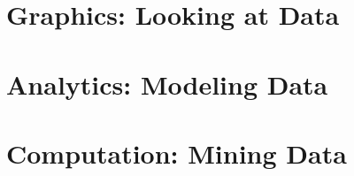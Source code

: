 \documentclass{book}
\begin{document}
\newif\ifplastex
\plastexfalse

\ifplastex
    \usepackage{localdef}
    \maketitle

\else



\fi



\makeatletter
\makeatother




\makeatletter
\makeatother


\mainmatter


\part{Graphics: Looking at Data}
\label{part:graphics}



%
%
%
%
 
\part{Analytics: Modeling Data}
\label{part:analytics}

%
%
%
%
%

\part{Computation: Mining Data}
\label{part:computation}
\end{document}
